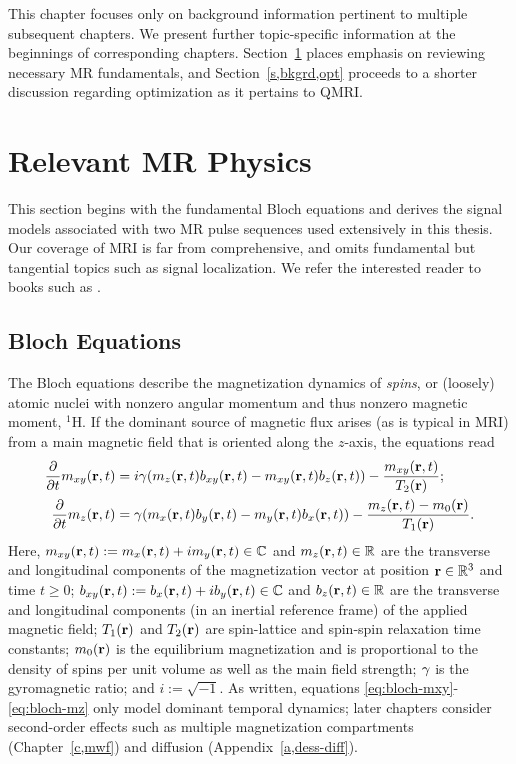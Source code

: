 
This chapter focuses
only on background information 
pertinent to multiple subsequent chapters.
We present further topic-specific information 
at the beginnings 
of corresponding chapters.
Section~\ref{s,bkgrd,mri} places emphasis
on reviewing necessary MR fundamentals,
and Section~\ref{s,bkgrd,opt}
proceeds to a shorter discussion
regarding optimization
as it pertains to QMRI.

\section{Relevant MR Physics}
\label{s,bkgrd,mri}

This section begins
with the fundamental Bloch equations
and derives the signal models
associated with 
two MR pulse sequences
used extensively in this thesis.
Our coverage of MRI
is far from comprehensive, 
and omits fundamental but tangential topics
such as signal localization.
We refer the interested reader
to books such as 
\cite{macovski:83,haacke:99,nishimura:96:pom}.

\subsection{Bloch Equations}
\label{ss,bkgrd,mri,bloch}

The Bloch equations
\cite{bloch:1946:ni-paper}
describe the magnetization dynamics
of \emph{spins}, 
or (loosely) atomic nuclei with nonzero 
angular momentum
and thus nonzero magnetic moment,
\eg $^1$H.
If the dominant source
of magnetic flux 
arises 
(as is typical in MRI)
from a main magnetic field
that is oriented along the $z$-axis,
the equations read
\begin{align}
	\dela{t} \mxy\prt &= i\gam\paren{\mz\prt \bxy\prt - \mxy\prt \bz\prt} -
		\frac{\mxy\prt}{\Tt\pr} ;
		\label{eq:bloch-mxy} \\
	\dela{t} \mz\prt &= \gam\paren{\mx\prt \by\prt - \my\prt \bx\prt} - 
		\frac{\mz\prt - \mzero\pr}{\To\pr}.
		\label{eq:bloch-mz}
\end{align}
Here, 
$\mxy\prt := \mx\prt + i\my\prt \in \complex$
and
$\mz\prt \in \real$
are the transverse and longitudinal components 
of the magnetization vector
at position $\mathbf{r} \in \mathbb{R}^{3}$ and time $t\geq0$;
$\bxy\prt := \bx\prt + i\by\prt \in \complex$
and 
$\bz\prt \in \real$
are the transverse and longitudinal components 
(in an inertial reference frame)
of the applied magnetic field;
$\To\pr$ and $\Tt\pr$
are spin-lattice and spin-spin relaxation time constants;
$\mzero\pr$ 
is the equilibrium magnetization
and is proportional to the density
of spins per unit volume
as well as the main field strength;
$\gamma$
is the gyromagnetic ratio;
and $i := \sqrt{-1}$.
As written,
equations \eqref{eq:bloch-mxy}-\eqref{eq:bloch-mz}
only model dominant temporal dynamics;
later chapters consider second-order effects
such as multiple magnetization compartments
(Chapter~\ref{c,mwf})
and diffusion
(Appendix~\ref{a,dess-diff}).

